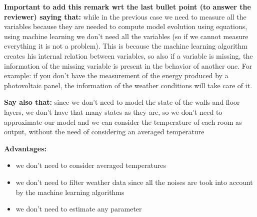 \textcolor[rgb]{0,0,1}{\textbf{Important to add this remark wrt the last bullet point (to answer the reviewer) saying that:} while in the previous case we need to measure all the variables because they are needed to compute model evolution using equations, using machine learning we don't need all the variables (so if we cannot measure everything it is not a problem). This is because the machine learning algorithm creates his internal relation between variables, so also if a variable is missing, the information of the missing variable is present in the behavior of another one. For example: if you don't have the measurement of the energy produced by a photovoltaic panel, the information of the weather conditions will take care of it.}

\textcolor[rgb]{0,0,1}{\textbf{Say also that:} since we don't need to model the state of the walls and floor layers, we don't have that many states as they are, so we don't need to approximate our model and we can consider the temperature of each room as output, without the need of considering an averaged temperature}

\textcolor[rgb]{0,0,1}{\textbf{Advantages:}
\begin{itemize}
	\item we don't need to consider averaged temperatures
	\item we don't need to filter weather data since all the noises are took into account by the machine learning algorithms
	\item we don't need to estimate any parameter
\end{itemize}}


